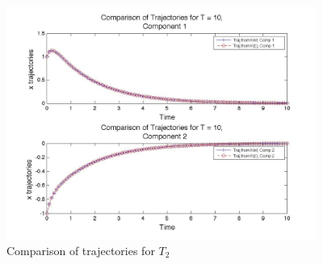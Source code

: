 \documentclass[12pt, notitlepage, letterpaper]{article}
\begin{document}
\begin{figure}[h]
\begin{center}
\includegraphics[width=4in]{xCompareT10}
\caption{ Comparison of trajectories for $T_2$ }
\end{center}
\end{figure}
\end{document}
